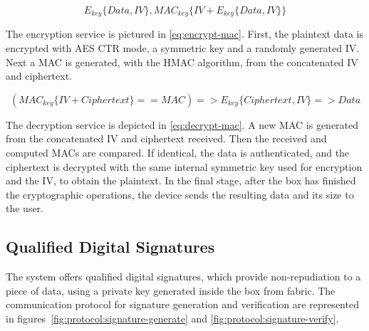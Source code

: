 \begin{equation}
	\label{eq:encrypt-mac}
	E_{key}\{Data, IV\}, MAC_{key}\{IV+E_{key}\{Data, IV\}\}
\end{equation}

The encryption service is pictured in \ref{eq:encrypt-mac}.
First, the plaintext data is encrypted with \ac{AES} \ac{CTR} mode, a symmetric key and a randomly generated \ac{IV}. Next a \ac{MAC} is generated, with the \ac{HMAC} algorithm, from the concatenated \ac{IV} and ciphertext.

\begin{equation}
	\label{eq:decrypt-mac}
	(MAC_{key}\{IV+Ciphertext\} == MAC) => E_{key}\{Ciphertext, IV\} => Data
\end{equation}

The decryption service is depicted in \ref{eq:decrypt-mac}.
A new \ac{MAC} is generated from the concatenated \ac{IV} and ciphertext received. Then the received and computed {MAC}s are compared. If identical, the data is authenticated, and the ciphertext is decrypted with the same internal symmetric key used for encryption and the \ac{IV}, to obtain the plaintext.
In the final stage, after the box has finished the cryptographic operations, the device sends the resulting data and its size to the user.

\subsection{Qualified Digital Signatures}\label{chap:arch:services:signatures}

The system offers qualified digital signatures, which provide non-repudiation to a piece of data, using a private key generated inside the box from fabric.
The communication protocol for signature generation and verification are represented in figures~\ref{fig:protocol:signature-generate} and \ref{fig:protocol:signature-verify}.

